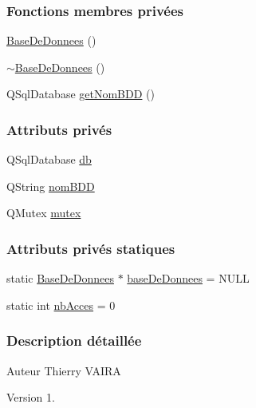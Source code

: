 \subsubsection*{Fonctions membres privées}
\begin{DoxyCompactItemize}
\item 
\hyperlink{class_base_de_donnees_ac4d0c514f439b3a19dc35c159955373a}{Base\+De\+Donnees} ()
\item 
\hyperlink{class_base_de_donnees_a5dc474cdbe003644fb0ca7b8f2ec6b93}{$\sim$\+Base\+De\+Donnees} ()
\item 
Q\+Sql\+Database \hyperlink{class_base_de_donnees_a467909531ae3cdebaf173f6e97cdc624}{get\+Nom\+B\+DD} ()
\end{DoxyCompactItemize}
\subsubsection*{Attributs privés}
\begin{DoxyCompactItemize}
\item 
Q\+Sql\+Database \hyperlink{class_base_de_donnees_a3e738dcf443370c46a541677ab619f06}{db}
\item 
Q\+String \hyperlink{class_base_de_donnees_a67c1d973c267a8f5fd6d7461550faa11}{nom\+B\+DD}
\item 
Q\+Mutex \hyperlink{class_base_de_donnees_aa1b4696fac87a740f914aa73739086f2}{mutex}
\end{DoxyCompactItemize}
\subsubsection*{Attributs privés statiques}
\begin{DoxyCompactItemize}
\item 
static \hyperlink{class_base_de_donnees}{Base\+De\+Donnees} $\ast$ \hyperlink{class_base_de_donnees_a822ba0b7cf85b1e48ced8efd3d65e266}{base\+De\+Donnees} = N\+U\+LL
\item 
static int \hyperlink{class_base_de_donnees_a5099ecb2922bb31d84cd5d4505298a29}{nb\+Acces} = 0
\end{DoxyCompactItemize}


\subsubsection{Description détaillée}
\begin{DoxyAuthor}{Auteur}
Thierry V\+A\+I\+RA
\end{DoxyAuthor}
\begin{DoxyVersion}{Version}
1. 
\end{DoxyVersion}


